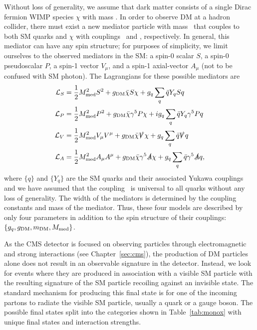 Without loss of generality, we assume that dark matter consists of a single Dirac fermion WIMP species $\chi$ with mass \mdm. 
In order to observe DM at a hadron collider, there must exist a new mediator particle with mass \mmed\ that couples to both SM quarks and $\chi$ with couplings \gq\ and \gdm, respectively.
In general, this mediator can have any spin structure; for purposes of simplicity, we limit ourselves to the observed mediators in the SM: a spin-0 scalar $S$, a spin-0 pseudoscalar $P$, a spin-1 vector $V_\mu$, and a spin-1 axial-vector $A_\mu$ (not to be confused with SM photon). %
The Lagrangians for these possible mediators are
\begin{align}
  \mathcal{L}_{S} & = \frac{1}{2} M_{\text{med}}^2 S^2 + g_{\text{DM}} \bar \chi S \chi + g_{{q}} \sum\limits_q \bar q Y_q S q \\
  \mathcal{L}_{P} & = \frac{1}{2} M_{\text{med}}^2 P^2 + g_{\text{DM}} \bar \chi \gamma^5 P \chi + i g_{{q}} \sum\limits_q \bar q Y_q \gamma^5 P q \\
  \mathcal{L}_{V} & = \frac{1}{2} M_{\text{med}}^2 V_\mu V^\mu + g_{\text{DM}} \bar \chi \slashed V \chi + g_{{q}} \sum\limits_q \bar q \slashed V q \\
  \mathcal{L}_{A} & = \frac{1}{2} M_{\text{med}}^2 A_\mu A^\mu + g_{\text{DM}} \bar \chi \gamma^5 \slashed A \chi + g_{{q}} \sum\limits_q \bar q \gamma^5 \slashed A q ,
\end{align}
where $\{q\}$ and $\{Y_q\}$ are the SM quarks and their associated Yukawa couplings and we have assumed that the coupling \gq\ is universal to all quarks without any loss of generality.
The width of the mediators is determined by the coupling constants and mass of the mediator.
Thus, these four models are described by only four parameters in addition to the spin structure of their couplings: $\{g_{{q}}, g_{\text{DM}}, m_{\text{DM}}, M_{\text{med}}\}$. %

As the CMS detector is focused on observing particles through electromagnetic and strong interactions (see Chapter~\ref{sec:cms}), the production of DM particles alone does not result in an observable signature in the detector.
Instead, we look for events where they are produced in association with a visible SM particle with the resulting signature of the SM particle recoiling against an invisible state.
The standard mechanism for producing this final state is for one of the incoming partons to radiate the visible SM particle, usually a quark or a gauge boson.%
The possible final states split into the categories shown in Table~\ref{tab:monox} with unique final states and interaction strengths.

